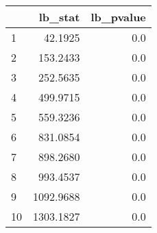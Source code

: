 \begin{tabular}{lrr}
\toprule
{} &    lb\_stat &  lb\_pvalue \\
\midrule
1  &    42.1925 &        0.0 \\
2  &   153.2433 &        0.0 \\
3  &   252.5635 &        0.0 \\
4  &   499.9715 &        0.0 \\
5  &   559.3236 &        0.0 \\
6  &   831.0854 &        0.0 \\
7  &   898.2680 &        0.0 \\
8  &   993.4537 &        0.0 \\
9  &  1092.9688 &        0.0 \\
10 &  1303.1827 &        0.0 \\
\bottomrule
\end{tabular}
